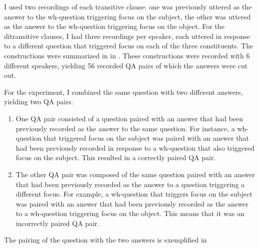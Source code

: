 I used two recordings of each transitive clause: one was previously uttered as the answer to the wh-question triggering focus on the subject, the other was uttered as the answer to the wh-question triggering focus on the object. For the ditransitive clauses, I had three recordings per speaker, each uttered in response to a different question that triggered focus on each of the three constituents. The constructions were summarized in  	 in  . These constructions were recorded with 6 different speakers, yielding 56 recorded QA pairs of which the answers were cut out.


For the experiment, I combined the same question with two different answers, yielding two QA pairs.


\begin{enumerate}
	\item 	One QA pair consisted of a question paired with an answer that had been previously recorded as the answer to the same question. For instance, a wh-question that triggered focus on the subject was paired with an answer that had been previously recorded in response to a wh-question that also triggered focus on the subject. This resulted in a correctly paired QA pair.
	\item 	The other QA pair was composed of the same question paired with an answer that had been previously recorded as the answer to a question triggering a different focus. For example, a wh-question that triggers focus on the subject was paired with an answer that had been previously recorded as the answer to a wh-question triggering focus on the object. This means that it was an incorrectly paired QA pair.
\end{enumerate}




The pairing of the question with the two answers is exemplified in  

